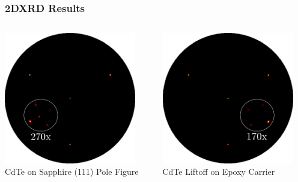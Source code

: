 \documentclass[]{beamer}%
\begin{document}
\begin{frame}
    \frametitle{2DXRD Results}
    \begin{columns}
        \begin{column}{0.5\textwidth}
            \centering
            \includegraphics[width=0.9\textwidth]{graphics/cdteliftoff_F22_attached} \\
            CdTe on Sapphire (111) Pole Figure
        \end{column}
        \begin{column}{0.5\textwidth}
            \centering
            \includegraphics[width=0.9\textwidth]{graphics/cdteliftoff_F22_released} \\
            CdTe Liftoff on Epoxy Carrier
        \end{column}
    \end{columns}
\end{frame}
\end{document}
